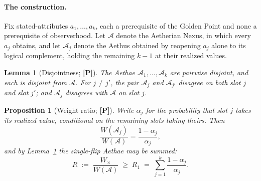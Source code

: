 \documentclass[11pt]{article}
\numberwithin{equation}{section}
\theoremstyle{plain}
\newtheorem{proposition}[theorem]{Proposition}
\newtheorem{lemma}[theorem]{Lemma}
\theoremstyle{definition}
\theoremstyle{remark}
\begin{document}
\paragraph{The construction.} Fix stated-attributes
$a_1,\dots,a_k$, each a prerequisite of the Golden Point and none a
prerequisite of observerhood. Let $\mathcal A$ denote the Aetherian
Nexus, in which every $a_j$ obtains, and let $\mathcal A_j$ denote the
Aethus obtained by reopening $a_j$ alone to its logical complement,
holding the remaining $k-1$ at their realized values.

\begin{lemma}[Disjointness; \textbf{[P]}]\label{gc:lem:disjoint}
The Aethae $\mathcal A_1,\dots,\mathcal A_k$ are pairwise disjoint, and
each is disjoint from $\mathcal A$. For $j\neq j'$, the pair
$\mathcal A_j$ and $\mathcal A_{j'}$ disagree on \emph{both} slot $j$
and slot $j'$; and $\mathcal A_j$ disagrees with $\mathcal A$ on slot
$j$.
\end{lemma}

\begin{proposition}[Weight ratio; \textbf{[P]}]\label{gc:prop:ratio}
Write $\alpha_j$ for the probability that slot $j$ takes its realized
value, conditional on the remaining slots taking theirs. Then
\begin{equation}\label{gc:eq:ratio}
\frac{W(\mathcal A_j)}{W(\mathcal A)}=\frac{1-\alpha_j}{\alpha_j},
\end{equation}
and by Lemma~\ref{gc:lem:disjoint} the single-flip Aethae may be summed:
\begin{equation}\label{gc:eq:bound}
R \;:=\; \frac{W_\times}{W(\mathcal A)}
\;\ge\; R_1 \;=\; \sum_{j=1}^{k}\frac{1-\alpha_j}{\alpha_j}.
\end{equation}
\end{proposition}
\end{document}
